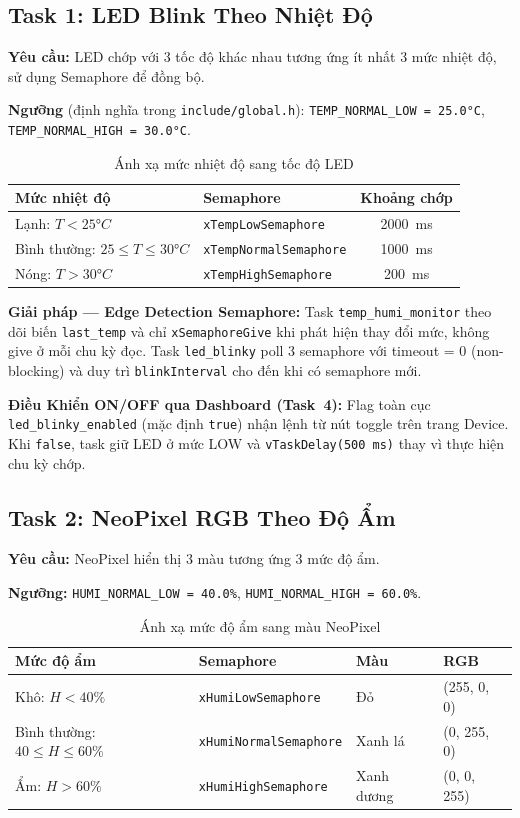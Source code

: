 \documentclass[12pt,a4paper]{article}
\begin{document}
\subsection{Task 1: LED Blink Theo Nhiệt Độ}

\textbf{Yêu cầu:} LED chớp với 3 tốc độ khác nhau tương ứng ít nhất 3 mức nhiệt độ, sử dụng Semaphore để đồng bộ.

\textbf{Ngưỡng} (định nghĩa trong \texttt{include/global.h}): \texttt{TEMP\_NORMAL\_LOW = 25.0°C}, \texttt{TEMP\_NORMAL\_HIGH = 30.0°C}.

\begin{table}[h!]
\centering
\begin{tabular}{|l|l|c|}
\hline
\textbf{Mức nhiệt độ} & \textbf{Semaphore} & \textbf{Khoảng chớp} \\
\hline
Lạnh: $T < 25°C$ & \texttt{xTempLowSemaphore} & 2000~ms \\
Bình thường: $25 \leq T \leq 30°C$ & \texttt{xTempNormalSemaphore} & 1000~ms \\
Nóng: $T > 30°C$ & \texttt{xTempHighSemaphore} & 200~ms \\
\hline
\end{tabular}
\caption{Ánh xạ mức nhiệt độ sang tốc độ LED}
\end{table}

\textbf{Giải pháp — Edge Detection Semaphore:} Task \texttt{temp\_humi\_monitor} theo dõi biến \texttt{last\_temp} và chỉ \texttt{xSemaphoreGive} khi phát hiện thay đổi mức, không give ở mỗi chu kỳ đọc. Task \texttt{led\_blinky} poll 3 semaphore với timeout = 0 (non-blocking) và duy trì \texttt{blinkInterval} cho đến khi có semaphore mới.

\textbf{Điều Khiển ON/OFF qua Dashboard (Task~4):} Flag toàn cục \texttt{led\_blinky\_enabled} (mặc định \texttt{true}) nhận lệnh từ nút toggle trên trang Device. Khi \texttt{false}, task giữ LED ở mức LOW và \texttt{vTaskDelay(500~ms)} thay vì thực hiện chu kỳ chớp.

\subsection{Task 2: NeoPixel RGB Theo Độ Ẩm}

\textbf{Yêu cầu:} NeoPixel hiển thị 3 màu tương ứng 3 mức độ ẩm.

\textbf{Ngưỡng:} \texttt{HUMI\_NORMAL\_LOW = 40.0\%}, \texttt{HUMI\_NORMAL\_HIGH = 60.0\%}.

\begin{table}[h!]
\centering
\begin{tabular}{|l|l|l|l|}
\hline
\textbf{Mức độ ẩm} & \textbf{Semaphore} & \textbf{Màu} & \textbf{RGB} \\
\hline
Khô: $H < 40\%$ & \texttt{xHumiLowSemaphore} & Đỏ & (255, 0, 0) \\
Bình thường: $40 \leq H \leq 60\%$ & \texttt{xHumiNormalSemaphore} & Xanh lá & (0, 255, 0) \\
Ẩm: $H > 60\%$ & \texttt{xHumiHighSemaphore} & Xanh dương & (0, 0, 255) \\
\hline
\end{tabular}
\caption{Ánh xạ mức độ ẩm sang màu NeoPixel}
\end{table}
\end{document}
